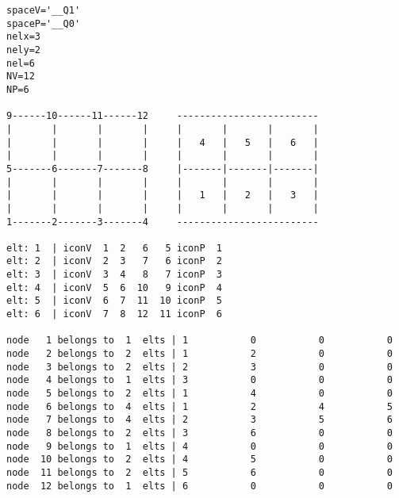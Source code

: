 \begin{small}
\begin{verbatim}
spaceV='__Q1'
spaceP='__Q0'
nelx=3
nely=2
nel=6
NV=12
NP=6

9------10------11------12     -------------------------
|       |       |       |     |       |       |       |
|       |       |       |     |   4   |   5   |   6   |
|       |       |       |     |       |       |       |
5-------6-------7-------8     |-------|-------|-------|
|       |       |       |     |       |       |       |
|       |       |       |     |   1   |   2   |   3   |
|       |       |       |     |       |       |       | 
1-------2-------3-------4     ------------------------- 

elt: 1  | iconV  1  2   6   5 iconP  1
elt: 2  | iconV  2  3   7   6 iconP  2
elt: 3  | iconV  3  4   8   7 iconP  3
elt: 4  | iconV  5  6  10   9 iconP  4
elt: 5  | iconV  6  7  11  10 iconP  5
elt: 6  | iconV  7  8  12  11 iconP  6

node   1 belongs to  1  elts | 1           0           0           0
node   2 belongs to  2  elts | 1           2           0           0
node   3 belongs to  2  elts | 2           3           0           0
node   4 belongs to  1  elts | 3           0           0           0
node   5 belongs to  2  elts | 1           4           0           0
node   6 belongs to  4  elts | 1           2           4           5
node   7 belongs to  4  elts | 2           3           5           6
node   8 belongs to  2  elts | 3           6           0           0
node   9 belongs to  1  elts | 4           0           0           0
node  10 belongs to  2  elts | 4           5           0           0
node  11 belongs to  2  elts | 5           6           0           0
node  12 belongs to  1  elts | 6           0           0           0

\end{verbatim}
\end{small}








\newpage
